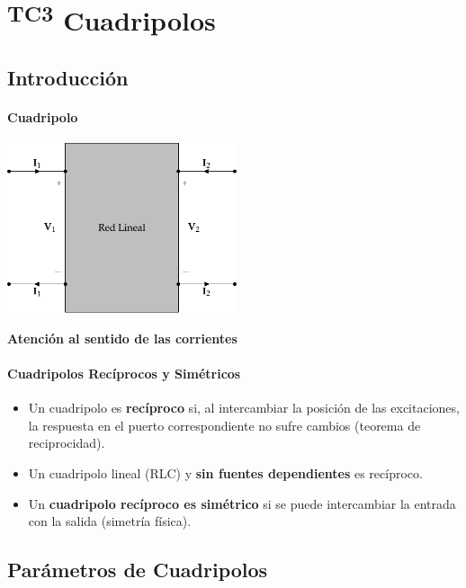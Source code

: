 \chapter{\textsuperscript{TC3} Cuadripolos}\label{chap:cuadripolos}
\section{Introducción}
\label{sec:org89dadb3}

\subsubsection{Cuadripolo}
\label{sec:org9ef7725}
\begin{center}
\includegraphics[height=5cm]{../figs/cuadripolo.pdf}
\end{center}

\begin{center}
\textbf{Atención al sentido de las corrientes}
\end{center}
\subsubsection{Cuadripolos Recíprocos y Simétricos}
\label{sec:org45c7b40}

\begin{itemize}
\item Un cuadripolo es \textbf{recíproco} si, al intercambiar la posición de las excitaciones, la respuesta en el puerto correspondiente no sufre cambios (teorema de reciprocidad).
\item Un cuadripolo lineal (RLC) y \textbf{sin fuentes dependientes} es recíproco.
\item Un \textbf{cuadripolo recíproco es simétrico} si se puede intercambiar la entrada con la salida (simetría física).
\end{itemize}
\section{Parámetros de Cuadripolos}
\label{sec:orgc7cab56}
